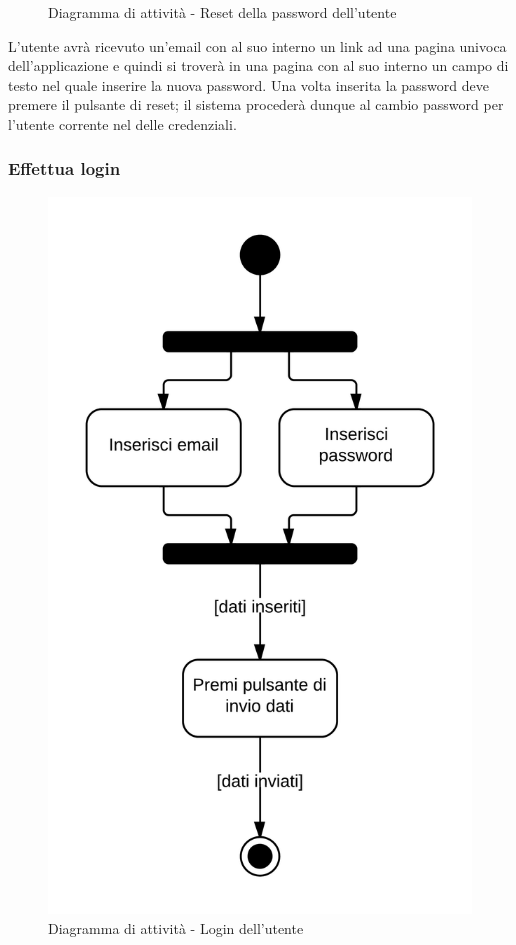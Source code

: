 \begin{figure}[H]
\caption{Diagramma di attività - Reset della password dell'utente}
\end{figure}

L'utente avrà ricevuto un'email con al suo interno un link ad una pagina univoca dell'applicazione  e quindi si troverà in una pagina con al suo interno un campo di testo nel quale inserire la nuova password. Una volta inserita la password deve premere il pulsante di reset; il sistema  procederà dunque al cambio password per l'utente corrente nel  delle credenziali.

\subsubsection{Effettua login}

\begin{figure}[H]
\centering
\includegraphics[scale=0.1]{uml/MaaP - Effettua login.png}
\caption{Diagramma di attività - Login dell'utente}
\end{figure}


